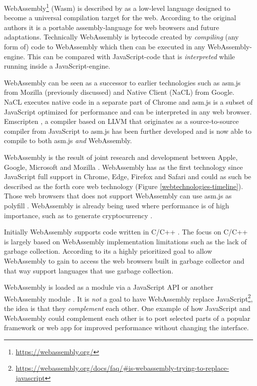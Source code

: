 WebAssembly\footnote{\url{https://webassembly.org/}} (Wasm) is described by \textcite{Watt2018,JangdaPowersGuhaBerger2019} as a low-level language designed to become a universal compilation target for the web. According to the original authors \textcite{HaasRossbergSchuffTitzerHolmanGohmanWagnerZakaiBastien2017} it is a portable assembly-language for web browsers and future adaptations. Technically WebAssembly is bytecode created by \emph{compiling} (any form of) code to WebAssembly \parencite{Watt2018} which then can be executed in any WebAssembly-engine. This can be compared with JavaScript-code that is \emph{interpreted} while running inside a JavaScript-engine.

WebAssembly can be seen as a successor to earlier technologies such as asm.js from Mozilla (previously discussed) and Native Client (NaCL) from Google. NaCL executes native code in a separate part of Chrome and asm.js  \parencite{Zakai2018} is a subset of JavaScript optimized for performance \parencite{VanEsNicolayStievenartDHondtDeRoover2016} and can be interpreted in any web browser. Emscripten \parencite{Zakai2011}, a compiler based on LLVM \parencite{LattnerAdve2014} that originates as a source-to-source compiler from JavaScript to asm.js \parencite{Zakai2011} has been further developed \parencite{HaasRossbergSchuffTitzerHolmanGohmanWagnerZakaiBastien2017} and is now able to compile to both asm.js \emph{and} WebAssembly.

WebAssembly is the result of joint research and development between Apple, Google, Microsoft and Mozilla \parencite{HaasRossbergSchuffTitzerHolmanGohmanWagnerZakaiBastien2017}. WebAssembly has as the first technology since JavaScript full support in Chrome, Edge, Firefox and Safari and could as such be described as the forth core web technology (Figure \ref{webtechnologies-timeline}). Those web browsers that does not support WebAssembly can use asm.js as polyfill \parencite{HaasRossbergSchuffTitzerHolmanGohmanWagnerZakaiBastien2017}. WebAssembly is already being used where performance is of high importance, such as to generate cryptocurrency \parencite{RuthZimmermannWolsingHohlfeld2018}.

Initially WebAssembly supports code written in C/C++ \parencite{HaasRossbergSchuffTitzerHolmanGohmanWagnerZakaiBastien2017}. 
The focus on C/C++ is largely based on WebAssembly implementation limitations such as the lack of garbage collection. According to \textcite{HaasRossbergSchuffTitzerHolmanGohmanWagnerZakaiBastien2017} its a highly prioritized goal to allow WebAssembly to gain to access the web browsers built in garbage collector and that way support languages that use garbage collection.

WebAssembly is loaded as a module via a JavaScript API or another WebAssembly module \parencite{HaasRossbergSchuffTitzerHolmanGohmanWagnerZakaiBastien2017}. It is \emph{not} a goal to have WebAssembly replace JavaScript\footnote{\url{https://webassembly.org/docs/faq/\#is-webassembly-trying-to-replace-javascript}}, the idea is that they \emph{complement} each other. One example of how JavaScript and WebAssembly could complement each other is to port selected parts of a popular framework or web app for improved performance without changing the interface.
